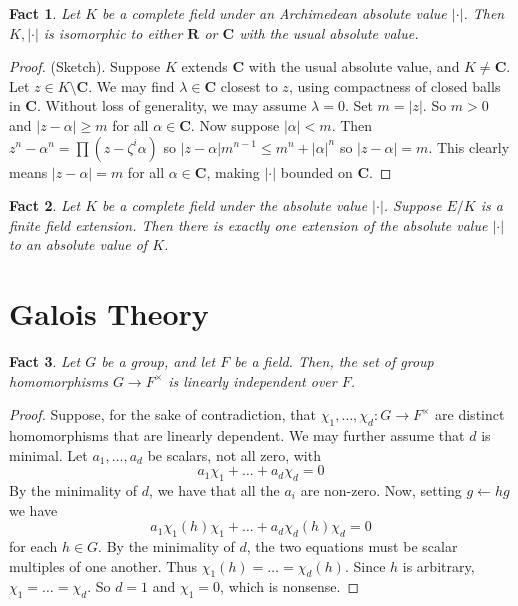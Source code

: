 \documentclass[12pt]{article}
\newtheorem*{fact*}{Fact}
\newcommand{\abs}[1]{\left\lvert#1\right\rvert}
\newcommand{\too}{\longrightarrow}
\newcommand{\C}{\mathbf{C}}
\newcommand{\R}{\mathbf{R}}
\begin{document}
\begin{fact*}
Let $K$ be a complete field under an Archimedean absolute value $\abs{\cdot}$. Then $K,\abs{\cdot}$ is isomorphic to either $\R$ or $\C$ with the usual absolute value.
\end{fact*}


\begin{proof}
(Sketch). Suppose $K$ extends $\C$ with the usual absolute value, and $K\neq \C$. Let $z\in K\setminus\C$. We may find $\lambda\in\C$ closest to $z$, using compactness of closed balls in $\C$. Without loss of generality, we may assume $\lambda=0$. Set $m=\abs{z}$. So $m>0$ and $\abs{z-\alpha} \ge m$ for all $\alpha\in\C$. Now suppose $\abs{\alpha} < m$. Then $z^n-\alpha^n = \prod (z-\zeta^i \alpha)$ so $\abs{z-\alpha} m^{n-1} \le m^n + \abs{\alpha}^n$ so $\abs{z-\alpha} = m$. This clearly means $\abs{z-\alpha}=m$ for all $\alpha\in\C$, making $\abs{\cdot}$ bounded on $\C$.
\end{proof}


\begin{fact*}
Let $K$ be a complete field under the absolute value $\abs{\cdot}$. Suppose $E/K$ is a finite field extension. Then there is exactly one extension of the absolute value $\abs{\cdot}$ to an absolute value of $K$.
\end{fact*}


\newpage
\section{Galois Theory}
\begin{fact*}
Let $G$ be a group, and let $F$ be a field. Then, the set of group homomorphisms $G\too F^\times$ is linearly independent over $F$.
\end{fact*}


\begin{proof}
Suppose, for the sake of contradiction, that $\chi_1,\dots,\chi_d : G\too F^\times$ are distinct homomorphisms that are linearly dependent. 
We may further assume that $d$ is minimal. 
Let $a_1,\dots,a_d$ be scalars, not all zero, with \[a_1\chi_1 + \dots + a_d\chi_d = 0\]
By the minimality of $d$, we have that all the $a_i$ are non-zero. 
Now, setting $g\leftarrow hg$ we have
\[a_1\chi_1(h)\chi_1 + \dots + a_d\chi_d(h)\chi_d = 0\]
for each $h\in G$. By the minimality of $d$, the two equations must be scalar multiples of one another. Thus $\chi_1(h)=\dots=\chi_d(h)$. Since $h$ is arbitrary, $\chi_1=\dots=\chi_d$. So $d=1$ and $\chi_1=0$, which is nonsense.
\end{proof}
\end{document}

